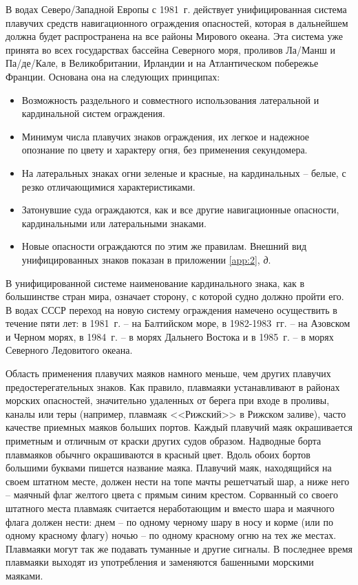 \documentclass[a4paper, 12pt, twoside, final, book, russian, fittopage, cyremdash]{ncc}
\begin{document}
В водах Северо\-/Западной Европы с 1981~г. действует унифицированная система плавучих средств навигационного ограждения опасностей, которая в дальнейшем должна будет распространена на все районы Мирового океана. Эта система уже принята во всех государствах бассейна Северного моря, проливов Ла\-/Манш и Па\-/де\-/Кале, в Великобритании, Ирландии и на Атлантическом побережье Франции. Основана она на следующих принципах: 

\begin{itemize}
\item Возможность раздельного и совместного использования латеральной и кардинальной систем ограждения. 
\item Минимум числа плавучих знаков ограждения, их легкое и надежное опознание по цвету и характеру огня, без применения секундомера. 
\item На латеральных знаках огни зеленые и красные, на кардинальных \--- белые, с резко отличающимися характеристиками. 
\item Затонувшие суда ограждаются, как и все другие навигационные опасности, кардинальными или латеральными знаками. 
\item Новые опасности ограждаются по этим же правилам. Внешний вид унифицированных знаков показан в приложении \ref{app:2}, \textit{д}. 
\end{itemize}

В унифицированной системе наименование кардинального знака, как в большинстве стран мира, означает сторону, с которой судно должно пройти его. В водах СССР переход на новую систему ограждения намечено осуществить в течение пяти лет: в 1981~г. \--- на Балтийском море, в 1982-1983~гг. \--- на Азовском и Черном морях, в 1984~г. \--- в морях Дальнего Востока и в 1985~г. \--- в морях Северного Ледовитого океана.

Область применения плавучих маяков намного меньше, чем других плавучих предостерегательных знаков. Как правило, плавмаяки устанавливают в районах морских опасностей, значительно удаленных от берега при входе в проливы, каналы или теры (например, плавмаяк <<Рижский>> в Рижском заливе), часто качестве приемных маяков больших портов. Каждый плавучий маяк окрашивается приметным и отличным от краски других судов образом. Надводные борта плавмаяков обычнго окрашиваются в красный цвет. Вдоль обоих бортов большими буквами пишется название маяка. Плавучий маяк, находящийся на своем штатном месте, должен нести на топе мачты решетчатый шар, а ниже него \--- маячный флаг желтого цвета с прямым синим крестом. Сорванный со своего штатного места плавмаяк считается неработающим и вместо шара и маячного флага должен нести: днем \--- по одному черному шару в носу и корме (или по одному красному флагу) ночью \--- по одному красному огню на тех же местах. Плавмаяки могут так же подавать туманные и другие сигналы. В последнее время плавмаяки выходят из употребления и заменяются башенными морскими маяками.
\end{document}
